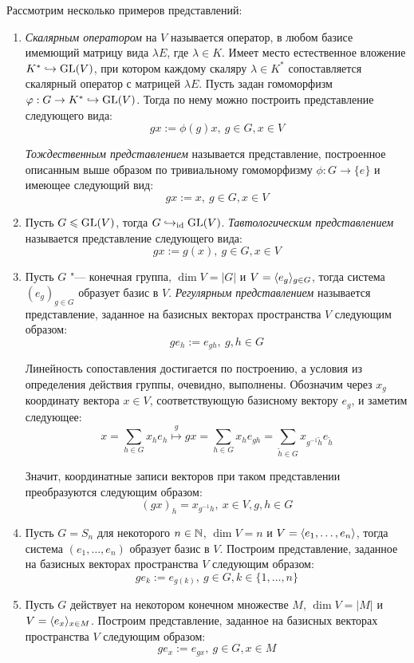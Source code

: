 \begin{example}
	Рассмотрим несколько примеров представлений:
	\begin{enumerate}
		\item \textit{Скалярным оператором} на $V$ называется оператор, в любом базисе имемющий матрицу вида $\lambda E$, где $\lambda \in K$. Имеет место естественное вложение $K^* \hookrightarrow \operatorname{GL}(V)$, при котором каждому скаляру $\lambda \in K^*$ сопоставляется скалярный оператор с матрицей $\lambda E$. Пусть задан гомоморфизм $\varphi: G \to K^* \hookrightarrow \operatorname{GL}(V)$. Тогда по нему можно построить представление следующего вида:
		\[gx := \phi(g)x,~g \in G, x \in V\]
		
		\textit{Тождественным представлением} называется представление, построенное описанным выше образом по тривиальному гомоморфизму $\phi : G \to \{e\}$ и имеющее следующий вид:
		\[gx := x,~g \in G, x \in V\]
		
		\item Пусть $G \leqslant \operatorname{GL}(V)$, тогда $G \hookrightarrow_{\mathrm{id}} \operatorname{GL}(V)$. \textit{Тавтологическим представлением} называется представление следующего вида:
		\[gx := g(x),~g \in G, x \in V\]
		
		\item Пусть $G$ "--- конечная группа, $\dim{V} = |G|$ и $V = \langle e_g\rangle_{g \in G}$, тогда система $(e_g)_{g \in G}$ образует базис в $V$. \textit{Регулярным представлением} называется представление, заданное на базисных векторах пространства $V$ следующим образом:
		\[ge_h := e_{gh},~g, h \in G\]
		
		Линейность сопоставления достигается по построению, а условия из определения действия группы, очевидно, выполнены. Обозначим через $x_g$ координату вектора $x \in V$, соответствующую базисному вектору $e_g$, и заметим следующее:
		\[x = \sum_{h \in G}x_he_h \stackrel{g}{\mapsto} gx = \sum_{h \in G}x_he_{gh} = \sum_{\widetilde h \in G}x_{g^{-1}\widetilde h}e_{\widetilde h}\]
		
		Значит, координатные записи векторов при таком представлении преобразуются следующим образом:
		\[(gx)_h = x_{g^{-1}h},~x \in V, g, h \in G\]
		
		\item Пусть $G = S_n$ для некоторого $n \in \mathbb{N}$, $\dim{V} = n$ и $V = \langle e_1, \dotsc, e_n\rangle$, тогда система $(e_1, \dotsc, e_n)$ образует базис в $V$. Построим представление, заданное на базисных векторах пространства $V$ следующим образом:
		\[ge_k := e_{g(k)},~g \in G, k \in \{1, \dotsc, n\}\]
		
		\item Пусть $G$ действует на некотором конечном множестве $M$, $\dim{V} = |M|$ и $V = \langle e_x \rangle_{x \in M}$. Построим представление, заданное на базисных векторах пространства $V$ следующим образом:
		\[ge_x := e_{gx},~g \in G, x \in M\]
	\end{enumerate}
\end{example}

